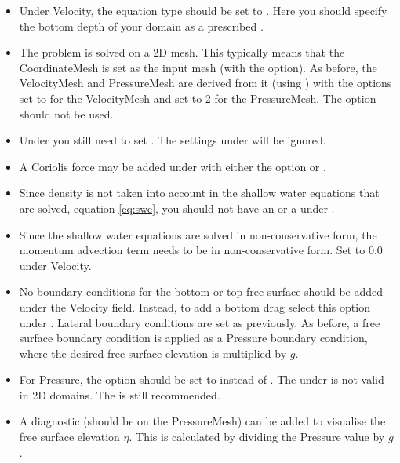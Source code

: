 \begin{itemize}
  \item Under Velocity, the equation type should be set to
    . Here you should specify the bottom depth
    of your domain as a prescribed .
  \item The problem is solved on a 2D mesh. This typically means that the
    CoordinateMesh is set as the input mesh (with the 
    option). As before, the VelocityMesh and PressureMesh are derived from it (using
    ) with the options  set to
     for the VelocityMesh and
     set to 2 for the PressureMesh.
    The option  should not be used.
  \item Under  you still need to set
    . The settings under
     will be ignored.
  \item A Coriolis force may be added under  with
    either the option  or .
  \item Since density is not taken into account in the shallow water equations
    that are solved, equation \eqref{eq:swe}, you should not have an
     or a  under
    .
  \item Since the shallow water equations are solved in non-conservative form,
    the momentum advection term needs to be in non-conservative form. Set
     to 0.0
    under Velocity.
  \item No boundary conditions for the bottom or top free surface should be
    added under the Velocity field. Instead, to add a bottom drag select this
    option under . Lateral boundary conditions
    are set as previously. As before, a free surface boundary condition is
    applied as a Pressure boundary condition, where the desired free surface
    elevation is multiplied by $g$.
  \item For Pressure, the option  should
    be set to  instead of .
    The  under  is not
    valid in 2D domains. The  is still recommended.
  \item A diagnostic  (should be on the
    PressureMesh) can be added to
    visualise the free surface elevation $\eta$. This is calculated by dividing
    the Pressure value by $g$.
\end{itemize}

